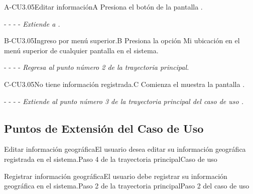 	
	\begin{UCtrayectoriaA}{A-CU3.05}{Editar información}{A}
	    \UCpaso[\UCactor]Presiona el botón  de la pantalla .
	    \item[- -] - - {\em Extiende a .} 
	\end{UCtrayectoriaA}
	
	\begin{UCtrayectoriaA}{B-CU3.05}{Ingreso por menú superior.}{B}
	    \UCpaso[\UCactor]Presiona la opción Mi ubicación en el menú superior de cualquier pantalla en el sistema. %
	    \item[- -] - - {\em Regresa al punto número 2 de la trayectoria principal.}
	\end{UCtrayectoriaA}
	
	\begin{UCtrayectoriaA}{C-CU3.05}{No tiene información registrada.}{C}
	    \UCpaso[\UCsist] Comienza el muestra la pantalla . %
	    \item[- -] - - {\em Extiende al punto número 3 de la trayectoria principal del caso de uso .}
	\end{UCtrayectoriaA}
	
	\subsection{Puntos de Extensión del Caso de Uso}

	\begin{UCExtenssionPoint}{Editar información geográfica}{El usuario desea editar su información geográfica registrada en el sistema.}{Paso 4 de la trayectoria principal}{Caso de uso  } 
	\end{UCExtenssionPoint}
	
	\begin{UCExtenssionPoint}{Registrar información geográfica}{El usuario debe registrar su información geográfica en el sistema.}{Paso 2 de la trayectoria principal}{Paso 2 del caso de uso } 
	\end{UCExtenssionPoint}
